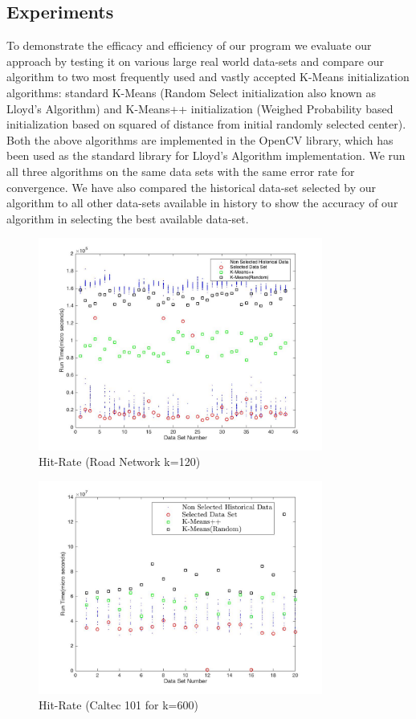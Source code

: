 \documentclass{vldb}
\begin{document}
\subsection{Experiments}
To demonstrate the efficacy and efficiency of our program we evaluate our approach by testing it on various large real world data-sets and compare our algorithm to two most frequently used and vastly accepted K-Means initialization algorithms: standard K-Means (Random Select initialization also known as Lloyd's Algorithm) and K-Means++ initialization (Weighed Probability based initialization based on squared of distance from initial randomly selected center). Both the above algorithms are implemented in the OpenCV library, which has been used as the standard library for Lloyd’s Algorithm implementation. We run all three algorithms on the same data sets with the same error rate for convergence.
We have also compared the historical data-set selected by our algorithm to all other data-sets available in history to show the accuracy of our algorithm in selecting the best available data-set.

\begin{figure}[t!]
    \includegraphics[width=\textwidth, height=7cm,keepaspectratio]{road_240}
    \caption{Hit-Rate (Road Network k=120)}
    \centering
    \label{fig:gas_240_selection}
\end{figure}

\begin{figure}[t!]
    \includegraphics[width=\textwidth, height=7cm,keepaspectratio]{nnData_600}
    \caption{Hit-Rate (Caltec 101 for k=600)}
    \centering
    \label{fig:caltec_600_selection}
\end{figure}
\end{document}
